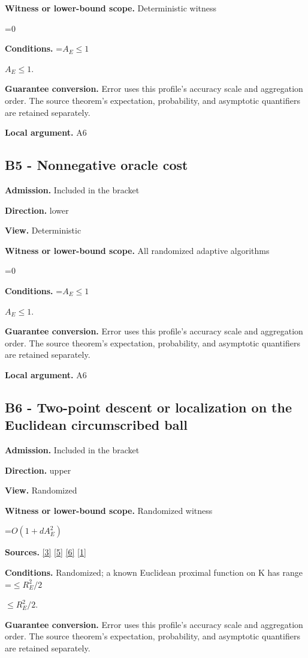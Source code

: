 \documentclass[10pt,a4paper]{article}
\newcommand{\AtlasMath}[1]{\par\begingroup\centering\setbox0=\hbox{$\displaystyle #1$}\ifdim\wd0>1.4\linewidth\typeout{ATLAS WIDE FORMULA: \the\wd0}\fi\ifdim\wd0>\linewidth\resizebox{\linewidth}{!}{\box0}\else\box0\fi\par\endgroup}
\newcommand{\AtlasInlineMath}[1]{\begingroup\setbox0=\hbox{$#1$}\ifdim\wd0>.4\linewidth\endgroup\AtlasMath{#1}\else\endgroup$#1$\fi}
\begin{document}
\textbf{Witness or lower-bound scope.} Deterministic witness

\AtlasMath{0}
\textbf{Conditions.} \AtlasInlineMath{A_E\le1}.

\textbf{Guarantee conversion.} Error uses this profile's accuracy scale and aggregation order. The source theorem's expectation, probability, and asymptotic quantifiers are retained separately.

\textbf{Local argument.} A6

\subsection{B5 - Nonnegative oracle cost}
\textbf{Admission.} Included in the bracket

\textbf{Direction.} lower

\textbf{View.} Deterministic

\textbf{Witness or lower-bound scope.} All randomized adaptive algorithms

\AtlasMath{0}
\textbf{Conditions.} \AtlasInlineMath{A_E\le1}.

\textbf{Guarantee conversion.} Error uses this profile's accuracy scale and aggregation order. The source theorem's expectation, probability, and asymptotic quantifiers are retained separately.

\textbf{Local argument.} A6

\subsection{B6 - Two-point descent or localization on the Euclidean circumscribed ball}
\textbf{Admission.} Included in the bracket

\textbf{Direction.} upper

\textbf{View.} Randomized

\textbf{Witness or lower-bound scope.} Randomized witness

\AtlasMath{O(1+dA_E^2)}
\textbf{Sources.} \href{https://jmlr.org/papers/volume18/16-632/16-632.pdf}{[3]} \href{https://arxiv.org/abs/1802.09022}{[5]} \href{https://proceedings.neurips.cc/paper_files/paper/2022/file/329ef22fd8cb68223d5df09a037f7dd9-Paper-Conference.pdf}{[6]} \href{https://arxiv.org/html/2610.00345v1}{[1]}

\textbf{Conditions.} Randomized; a known Euclidean proximal function on K has range \AtlasInlineMath{\le R_E^2/2}.

\textbf{Guarantee conversion.} Error uses this profile's accuracy scale and aggregation order. The source theorem's expectation, probability, and asymptotic quantifiers are retained separately.
\end{document}
